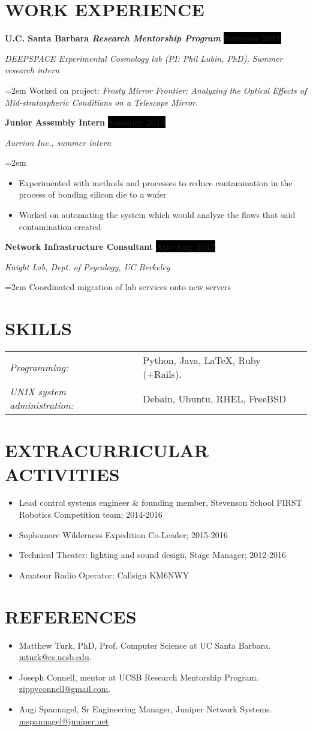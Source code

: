 \documentclass[paper=a4,fontsize=11pt]{scrartcl} %
\newcommand{\sepspace}{\vspace*{0.5em}}		%
\newcommand{\NewPart}[1]{\section*{\uppercase{#1}}}
\newcommand{\EducationEntry}[4]{
		\noindent \textbf{#1} \hfill      %
		\colorbox{Black}{%
			\parbox{6.5em}{%
			\hfill\color{White}\textbf{#2}}} \par  %
		\noindent \textit{#3} \par        %
		\noindent\hangindent=2em\hangafter=0 \small #4 %
		\normalsize \par}
\newcommand{\WorkEntry}[4]{				  %
		\noindent \textbf{#1} \hfill      %
		\colorbox{Black}{\color{White}\textbf{#2}} \par  %
		\noindent \textit{#3} \par              %
		\noindent\hangindent=2em\hangafter=0 \small #4 %
		\normalsize \par}
\begin{document}
\label{WORK}

\NewPart{Work experience}{}

\WorkEntry{U.C. Santa Barbara \textit{Research Mentorship Program}}{Summer 2015}{DEEPSPACE Experimental Cosmology lab (PI: Phil Lubin, PhD), Summer research intern}{Worked on project: \textit{Frosty Mirror Frontier: Analyzing the Optical Effects of Mid-stratospheric Conditions on a Telescope Mirror}.}
\sepspace

\WorkEntry{Junior Assembly Intern}{Summer 2014}{Aurrion Inc., summer intern}{\begin{itemize}\setlength\itemsep{0em}
		\item Experimented with methods and processes to reduce contamination in the process of bonding silicon die to a wafer
		\item Worked on automating the system which would analyze the flaws that said contamination created	\end{itemize} }
	
\WorkEntry{Network Infrastructure Consultant}{Apr-Aug 2017}{Knight Lab, Dept. of Psycology, UC Berkeley}{Coordinated migration of lab services onto new servers}

\vspace{-1em}

\label{SKILLS}
\NewPart{Skills}{}
\begin{tabular}{ll}
\textit{Programming:} & Python, Java, \LaTeX, Ruby (+Rails).\\
\textit{UNIX system administration:} & Debain, Ubuntu, RHEL, FreeBSD\\
\end{tabular}
\vspace{-1em}
\label{EXTRACUR}
\NewPart{Extracurricular Activities}{}
\begin{itemize}\setlength\itemsep{-.5em}
	\item Lead control systems engineer \& founding member, Stevenson School FIRST Robotics Competition team; 2014-2016
	\item Sophomore Wilderness Expedition Co-Leader; 2015-2016
	\item Technical Theater: lighting and sound design, Stage Manager; 2012-2016
	\item Amateur Radio Operator: Callsign KM6NWY
\end{itemize}
\vspace{-2em}
\label{REFERENCES}
\NewPart{References}{}
\begin{itemize}\setlength\itemsep{-.5em}
	\item Matthew Turk, PhD, Prof. Computer Science at UC Santa Barbara. \url{mturk@cs.ucsb.edu}.
	\item Joseph Connell, mentor at UCSB Research Mentorship Program. \url{zippyconnell@gmail.com}.
	\item Augi Spannagel, Sr Engineering Manager, Juniper Network Systems. \url{mspannagel@juniper.net}
\end{itemize}
\end{document}

